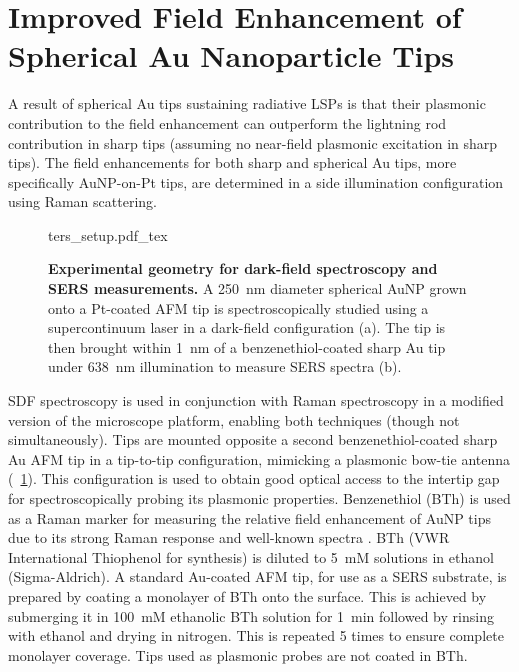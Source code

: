 \documentclass{article}
\begin{document}
\section{Improved Field Enhancement of Spherical Au Nanoparticle Tips}
\label{sec:tip_applications}

A result of spherical Au tips sustaining radiative LSPs is that their plasmonic contribution to the field enhancement can outperform the lightning rod contribution in sharp tips (assuming no near-field plasmonic excitation in sharp tips). The field enhancements for both sharp and spherical Au tips, more specifically AuNP-on-Pt tips, are determined in a side illumination configuration using Raman scattering.

\begin{figure}[bt]
\centering
\def\svgwidth{0.6\textwidth}\fontsize{10pt}{1em}\selectfont
{ters_setup.pdf_tex}
\caption[Experimental geometry for dark-field spectroscopy and SERS measurements]{\textbf{Experimental geometry for dark-field spectroscopy and SERS measurements.} A \SI{250}{nm} diameter spherical AuNP grown onto a Pt-coated AFM tip is spectroscopically studied using a supercontinuum laser in a dark-field configuration (a). The tip is then brought within \SI{1}{nm} of a benzenethiol-coated sharp Au tip under \SI{638}{nm} illumination to measure SERS spectra (b).}
\label{fig:ters_setup}
\end{figure}

SDF spectroscopy is used in conjunction with Raman spectroscopy in a modified version of the microscope platform, enabling both techniques (though not simultaneously). Tips are mounted opposite a second benzenethiol-coated sharp Au AFM tip in a tip-to-tip configuration, mimicking a plasmonic bow-tie antenna (\figurename~\ref{fig:ters_setup}). This configuration is used to obtain good optical access to the intertip gap for spectroscopically probing its plasmonic properties. Benzenethiol (BTh) is used as a Raman marker for measuring the relative field enhancement of AuNP tips due to its strong Raman response and well-known spectra \cite{mahajan2009, dudin2010}.
BTh (VWR International Thiophenol for synthesis) is diluted to \SI{5}{mM} solutions in ethanol (Sigma-Aldrich). A standard Au-coated AFM tip, for use as a SERS substrate, is prepared by coating a monolayer of BTh onto the surface. This is achieved by submerging it in \SI{100}{mM} ethanolic BTh solution for \SI{1}{\minute} followed by rinsing with ethanol and drying in nitrogen. This is repeated 5 times to ensure complete monolayer coverage. Tips used as plasmonic probes are not coated in BTh.
\end{document}
